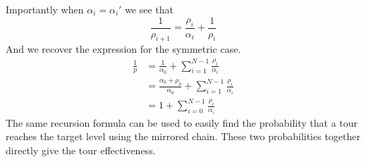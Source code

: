\documentclass{article}
\begin{document}
Importantly when $\alpha_i=\alpha_i'$ we see that
\[ \frac{1}{\rho_{i+1}} = \frac{\rho_i}{\alpha_i}+\frac{1}{\rho_i} \]
And we recover the expression for the symmetric case. 
\begin{align*}
    \frac{1}{p} &= \frac{1}{\alpha_0} + \sum_{i=1}^{N-1} \frac{\rho_i}{\alpha_i} \\
    &= \frac{\alpha_0+\rho_0}{\alpha_0} +  \sum_{i=1}^{N-1} \frac{\rho_i}{\alpha_i} \\
    &= 1+ \sum_{i=0}^{N-1} \frac{\rho_i}{\alpha_i}
\end{align*} 
The same recursion formula can be used to easily find the probability that a
tour reaches the target level using the mirrored chain. These two probabilities
together directly give the tour effectiveness.
\end{document}
